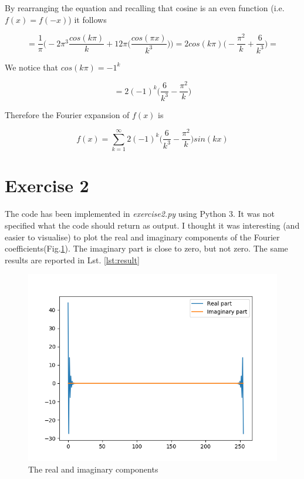\documentclass[12pt]{article}
\begin{document}
By rearranging the equation and recalling that cosine is an even function (i.e. $f(x) = f(-x)$) it follows

\begin{equation}
	= \frac{1}{\pi} \bigg( 
	-2 \pi^3 \frac{cos(k \pi)}{k}  
	+ 12\pi \big( \frac{cos(\pi x)}{k^3} \big)
	\bigg) =
	2  cos(k \pi) \big( 
	- \frac{\pi^2}{k}  
	+ \frac{6}{k^3} 
	\big) =
\end{equation}

We notice that $cos(k \pi) = -1^k$

\begin{equation}
	= 2  (-1)^k \big( 
	\frac{6}{k^3} 
	- \frac{\pi^2}{k}  
	\big)
\end{equation}

Therefore the Fourier expansion of $f(x)$ is

\begin{equation}
		f(x) = \sum_{k=1}^{\infty} 2  (-1)^k \big( 
	\frac{6}{k^3} 
	- \frac{\pi^2}{k}  
	\big)
	 sin(kx)
\end{equation}

\section*{Exercise 2}

The code has been implemented in \textit{exercise2.py} using Python 3. It was not specified what the code should return as output. I thought it was interesting (and easier to visualise) to plot the real and imaginary components of the Fourier coefficients(Fig.\ref{fig:result}). The imaginary part is close to zero, but not zero. The same results are reported in Lst. \ref{lst:result}

\begin{figure}[H]
	\centering
	\includegraphics[width=0.7 \linewidth]{plot}
	\caption{The real and imaginary components}
	\label{fig:result}
\end{figure}
\end{document}
